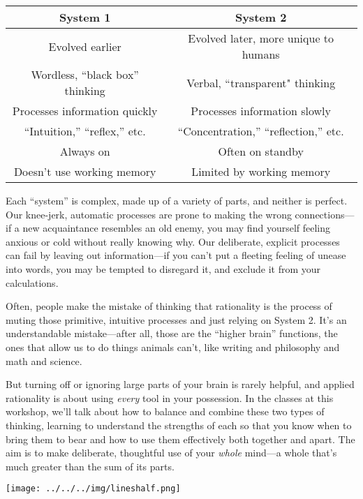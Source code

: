 	\renewcommand{\arraystretch}{1.2}
		\begin{table} \small \centering
			\begin{tabular}{ |c|c| }
			\hline
			\textbf{System 1} &  \textbf{System 2} \\
			\hline \hline
			 Evolved earlier & Evolved later, more unique to humans \\
			 Wordless, ``black box'' thinking & Verbal, ``transparent" thinking \\
			 Processes information quickly & Processes information slowly \\
			 ``Intuition,'' ``reflex,'' etc. & ``Concentration,'' ``reflection,'' etc. \\
			 Always on & Often on standby \\
			 Doesn't use working memory & Limited by working memory \\
			 \hline
			 \end{tabular}
		\end{table}
	 
	 Each ``system'' is complex, made up of a variety of parts, and neither is perfect.  Our knee-jerk, automatic processes are prone to making the wrong connections---if a new acquaintance resembles an old enemy, you may find yourself feeling anxious or cold without really knowing why.  Our deliberate, explicit processes can fail by leaving out information---if you can't put a fleeting feeling of unease into words, you may be tempted to disregard it, and exclude it from your calculations.
	 
	 Often, people make the mistake of thinking that rationality is the process of muting those primitive, intuitive processes and just relying on System 2.  It's an understandable mistake---after all, those are the ``higher brain'' functions, the ones that allow us to do things animals can't, like writing and philosophy and math and science.
	 
	 But turning off or ignoring large parts of your brain is rarely helpful, and applied rationality is about using \emph{every} tool in your possession.  In the classes at this workshop, we'll talk about how to balance and combine these two types of thinking, learning to understand the strengths of each so that you know when to bring them to bear and how to use them effectively both together and apart.  The aim is to make deliberate, thoughtful use of your \emph{whole} mind---a whole that's much greater than the sum of its parts.

\begin{center}
\texttt{[image: ../../../img/lineshalf.png]}
\end{center}